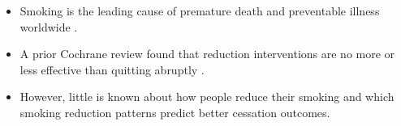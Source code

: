 \documentclass[
	25pt,
	a0paper, 
	portrait,
	blockverticalspace=-3em,
	margin=.5in,
	innermargin=0mm
]{tikzposter}
\begin{document}
	\maketitle[titletoblockverticalspace=0em]
{}
	{
	\centering
		\begin{columns}
			\begin{minipage}[]{0.525\linewidth}
				\begin{itemize}
					\large
					\item Smoking is the leading cause of premature death and preventable illness worldwide \citep{worldhealthorganizationWHOReportGlobal2011}.
					\item A prior Cochrane review found that reduction interventions are no more or less effective than quitting abruptly \citep{lindsonSmokingReductionInterventions2019}.
						\item However, little is known about how people reduce their smoking and which smoking reduction patterns predict better cessation outcomes.
				\end{itemize}
		    \end{minipage}
		\end{columns}
	}
		
\end{document}
